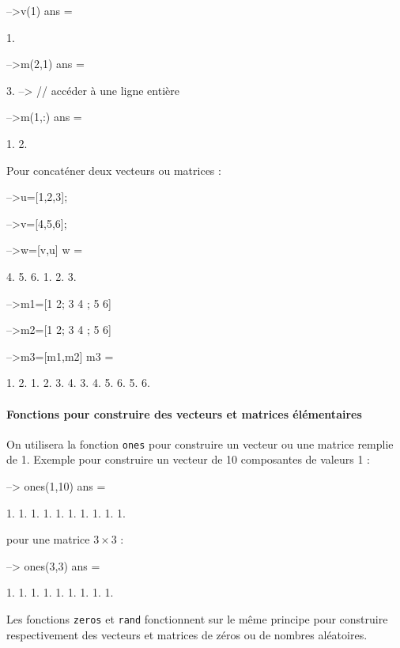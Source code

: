 \begin{Scilabcode}
-->v(1)
 ans  =
 
    1.  

-->m(2,1)
 ans  =
 
    3.  
--> // accéder à une ligne entière
 
-->m(1,:)
 ans  =
   
     1.    2. 
\end{Scilabcode}
Pour concaténer deux vecteurs ou matrices :
\begin{Scilabcode}
-->u=[1,2,3];
 
-->v=[4,5,6];
 
-->w=[v,u]
 w  =
 
    4.    5.    6.    1.    2.    3.

-->m1=[1 2; 3 4 ; 5 6]
 
-->m2=[1 2; 3 4 ; 5 6]
 
-->m3=[m1,m2]
 m3  =
 
    1.    2.    1.    2.  
    3.    4.    3.    4.  
    5.    6.    5.    6. 
\end{Scilabcode}
\paragraph{Fonctions pour construire des vecteurs et matrices élémentaires}
On utilisera la fonction \texttt{ones} pour construire un vecteur ou 
une matrice remplie de 1.
Exemple pour construire un vecteur de 10 composantes de valeurs 1 :
\begin{Scilabcode}
--> ones(1,10)
 ans  =

    1.   1.   1.   1.   1.   1.   1.   1.   1.   1.

\end{Scilabcode}
pour une matrice $3\times 3$ :
\begin{Scilabcode}
--> ones(3,3)
 ans  =

    1.   1.   1.
    1.   1.   1.
    1.   1.   1.
\end{Scilabcode}
Les fonctions \verb?zeros? et \verb?rand? fonctionnent sur le même principe 
pour construire respectivement des vecteurs et matrices de zéros ou de nombres 
aléatoires.

